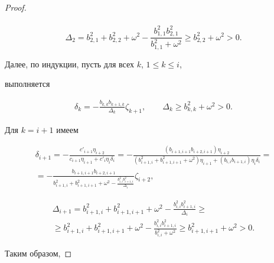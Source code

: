 \begin{proof}
\begin{multline*}
\end{multline*}

$$

{\Delta_2} = b_{2,1}^2 + b_{2,2}^2 + \omega^2 - {\frac{b_{1,1}^2

b_{2,1}^2}{b_{1,1}^2 + \omega^2}} \geqslant b_{2,2}^2 + \omega^2 > 0.

$$

Далее, по индукции, пусть для всех $k$, $1 \leqslant k \leqslant i$,

выполняется

\begin{gather*}

\delta_k = -{\frac{b_{k,k}b_{k+1,k}}{\Delta_k}} \zeta_{k+1}, \qquad

\Delta_k \geqslant b_{k,k}^2 + \omega^2 > 0.

\end{gather*}

Для $k=i+1$ имеем

\begin{multline*}

\delta_{i+1} = -{\frac{c'_{i+1} \eta_{i+2}}{c_{i+1} \eta_{i+1} +

c'_i \eta_i \delta_i}} = -{\frac{(b_{i+1,i+1}b_{i+2,i+1})

\eta_{i+2}}{(b_{i+1,i}^2 + b_{i+1,i+1}^2 + \omega^2) \eta_{i+1} +

(b_{i,i} b_{i+1,i}) \eta_i \delta_i}} = \\

= -{\frac{b_{i+1,i+1} b_{i+2,i+1}}{b_{i+1,i}^2 + b_{i+1,i+1}^2 +

\omega^2 - \frac{b_{i,i}^2 b_{i+1,i}^2}{\Delta_i}} \zeta_{i+2}}, 

\end{multline*}

\begin{multline*}

\Delta_{i+1} = b_{i+1,i}^2 + b_{i+1,i+1}^2 + \omega^2 -

\frac{b_{i,i}^2 b_{i+1,i}^2}{\Delta_i} \geqslant \\

\geqslant b_{i+1,i}^2 + b_{i+1,i+1}^2 + \omega^2 - \frac{b_{i,i}^2

b_{i+1,i}^2}{b_{i,i}^2 + \omega^2} \geqslant b_{i+1,i+1}^2 +

\omega^2 > 0.

\end{multline*} 



\noindent Таким образом,


\end{proof}
